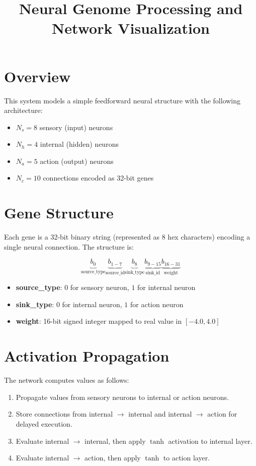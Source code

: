 \documentclass{article}
\title{Neural Genome Processing and Network Visualization}
\author{}
\date{}
\begin{document}
\maketitle

\section*{Overview}

This system models a simple feedforward neural structure with the following architecture:
\begin{itemize}
    \item $N_s = 8$ sensory (input) neurons
    \item $N_h = 4$ internal (hidden) neurons
    \item $N_a = 5$ action (output) neurons
    \item $N_c = 10$ connections encoded as 32-bit genes
\end{itemize}

\section*{Gene Structure}

Each gene is a 32-bit binary string (represented as 8 hex characters) encoding a single neural connection. The structure is:

\[
\underbrace{b_0}_{\text{source\_type}} \underbrace{b_{1-7}}_{\text{source\_id}} \underbrace{b_8}_{\text{sink\_type}} \underbrace{b_{9-15}}_{\text{sink\_id}} \underbrace{b_{16-31}}_{\text{weight}}
\]

\begin{itemize}
    \item \textbf{source\_type}: $0$ for sensory neuron, $1$ for internal neuron
    \item \textbf{sink\_type}: $0$ for internal neuron, $1$ for action neuron
    \item \textbf{weight}: 16-bit signed integer mapped to real value in $[-4.0, 4.0]$
\end{itemize}

\section*{Activation Propagation}

The network computes values as follows:

\begin{enumerate}
    \item Propagate values from sensory neurons to internal or action neurons.
    \item Store connections from internal $\to$ internal and internal $\to$ action for delayed execution.
    \item Evaluate internal $\to$ internal, then apply $\tanh$ activation to internal layer.
    \item Evaluate internal $\to$ action, then apply $\tanh$ to action layer.
\end{enumerate}
\end{document}
